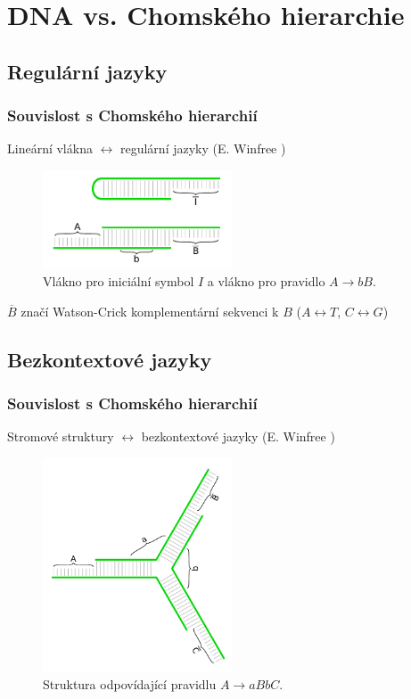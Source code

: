 \documentclass[10pt]{beamer}
\theoremstyle{definition}
\theoremstyle{remark}
\begin{document}
\section{DNA vs. Chomského hierarchie}
\subsection{Regulární jazyky}
\begin{frame}
\frametitle{Souvislost s Chomského hierarchií}
	Lineární vlákna $\leftrightarrow$ regulární jazyky (E. Winfree \cite{winfree_phd})
	\begin{figure}[h]
	\begin{center}
		\includegraphics[width=0.502\textwidth]{../figures/strand_types/linear.pdf} %
		\caption{Vlákno pro iniciální symbol $I$ a vlákno pro pravidlo $A\rightarrow bB$.}
	\end{center}
	\end{figure}
	$\overline{B}$ značí Watson-Crick komplementární sekvenci k $B$ ($A \leftrightarrow T$, $C \leftrightarrow G$)
\end{frame}

\subsection{Bezkontextové jazyky}
\begin{frame}
\frametitle{Souvislost s Chomského hierarchií}
	Stromové struktury $\leftrightarrow$ bezkontextové jazyky (E. Winfree \cite{winfree_phd})
	\begin{figure}[h]
	\begin{center}
		\includegraphics[width=0.502\textwidth]{../figures/strand_types/dendrimer.pdf} %
		\caption{Struktura odpovídající pravidlu $A\rightarrow aBbC$.}
	\end{center}
	\end{figure}
\end{frame}
\end{document}
